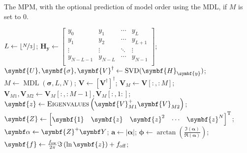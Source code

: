 \begin{algorithm}
    \caption[
        The \acl{MPM}, with the optional prediction of model order using the
        \acl{MDL}.
    ]
    {
        The \acs{MPM}, with the optional prediction of model order using the
        \acs{MDL}, if $M$ is set to $0$.
    }\label{alg:mpm}
    \begin{algorithmic}[1]
            \State $L \gets \left\lfloor \nicefrac{N}{3} \right\rfloor$;
            \State $\symbf{H}_{\symbf{y}} \gets
                \begin{bmatrix}
                    y_{0} & y_{1} & \cdots & y_{L}\\
                    y_{1} & y_{2} & \cdots & y_{L+1}\\
                    \vdots & \vdots & \ddots & \vdots\\
                    y_{N-L-1} & y_{N-L} & \cdots & y_{N-1}\\
                \end{bmatrix}
            $;
            \State $\symbf{U}, \symbf{\sigma}, \symbf{V}^{\dagger} \gets
            \SVD(\symbf{H}_{\symbf{y}})$;
                \State $M \gets \operatorname{MDL}(\symbf{\sigma}, L, N)$;
            \EndIf
            \State $\symbf{V} \gets \left[\symbf{V}^{\dagger}\right]^{\dagger}$;
            \State $\symbf{V}_M \gets \symbf{V}\left[:, :M\right]$;
            \State $
                \symbf{V}_{M1}, \symbf{V}_{M2} \gets
                \symbf{V}_M\left[:,:M-1\right],
                \symbf{V}_M\left[:,1:\right]
            $;
            \State $\symbf{z} \gets \textsc{Eigenvalues}\left(\symbf{V}_{M1}^+ \symbf{V}_{M2}^{\vphantom{+}}\right)$;
            \State $\symbf{Z} \gets
                \begin{bmatrix}
                    \symbf{1} & \symbf{z} & {\symbf{z}}^2 & \cdots & {\symbf{z}}^{N}
                \end{bmatrix}\T
            $;
            \State $\bdalpha \gets \symbf{Z}^+ \bY$;
            \State $
                \symbf{a} \gets \left\lvert\symbf{\alpha}\right\rvert$;
            \State $\symbf{\phi} \gets \arctan
                \left(\frac{\Im(\symbf{\alpha})}{\Re(\symbf{\alpha})}\right)
            $;
            \State $\symbf{f} \gets \frac{\fsw}{2\pi} \Im \left( \ln \symbf{z} \right) + \foff$;

\end{algorithmic}
\end{algorithm}
